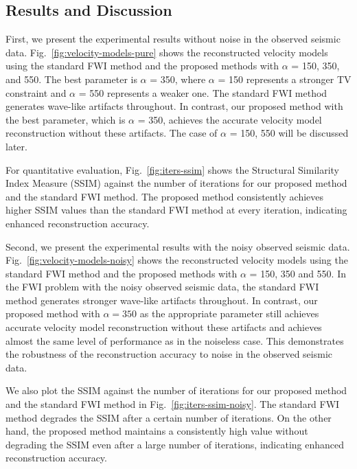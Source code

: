 \subsection{Results and Discussion} \label{subsec:results-and-discussion}
First, we present the experimental results without noise in the observed seismic data.
Fig.~\ref{fig:velocity-models-pure} shows the reconstructed velocity models using the standard FWI method and the proposed methods with $\alpha$ = 150, 350, and 550.
The best parameter is $\alpha$ = 350, where $\alpha$ = 150 represents a stronger TV constraint and $\alpha$ = 550 represents a weaker one.
The standard FWI method generates wave-like artifacts throughout.
In contrast, our proposed method with the best parameter, which is $\alpha$ = 350, achieves the accurate velocity model reconstruction without these artifacts.
The case of $\alpha$ = 150, 550 will be discussed later.

For quantitative evaluation, Fig.~\ref{fig:iters-ssim} shows the Structural Similarity Index Measure (SSIM) against the number of iterations for our proposed method and the standard FWI method.
The proposed method consistently achieves higher SSIM values than the standard FWI method at every iteration, indicating enhanced reconstruction accuracy.

Second, we present the experimental results with the noisy observed seismic data.
Fig.~\ref{fig:velocity-models-noisy} shows the reconstructed velocity models using the standard FWI method and the proposed methods with $\alpha$ = 150, 350 and 550.
In the FWI problem with the noisy observed seismic data, the standard FWI method generates stronger wave-like artifacts throughout.
In contrast, our proposed method with $\alpha = 350$ as the appropriate parameter still achieves accurate velocity model reconstruction without these artifacts and achieves almost the same level of performance as in the noiseless case.
This demonstrates the robustness of the reconstruction accuracy to noise in the observed seismic data.

We also plot the SSIM against the number of iterations for our proposed method and the standard FWI method in Fig.~\ref{fig:iters-ssim-noisy}.
The standard FWI method degrades the SSIM after a certain number of iterations.
On the other hand, the proposed method maintains a consistently high value without degrading the SSIM even after a large number of iterations, indicating enhanced reconstruction accuracy.

